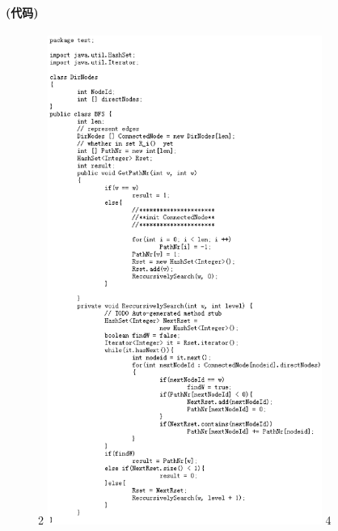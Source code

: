 \documentclass[a4paper,10pt]{article}
\begin{document}
\paragraph{(代码)}
\begin{figure}[h]
2  \includegraphics[width=0.8\textwidth]{1}
4 \end{figure}
\end{document}
